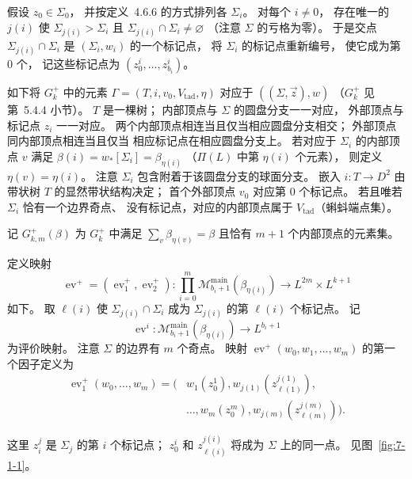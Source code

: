假设 $z_0\in\Sigma_0$，
并按定义~4.6.6 的方式排列各 $\Sigma_i$。
对每个 $i\ne0$，
存在唯一的 $j(i)$ 使
$\Sigma_{j(i)}>\Sigma_i$ 且
$\Sigma_{j(i)}\cap\Sigma_i\ne\varnothing$
（注意 $\Sigma$ 的亏格为零）。
于是交点
$\Sigma_{j(i)}\cap\Sigma_i$
是 $(\Sigma_i,w_i)$ 的一个标记点，
将 $\Sigma_i$ 的标记点重新编号，
使它成为第 $0$ 个，
记这些标记点为
$(z_0^i,\ldots,z_{b_i}^i)$。

如下将 $G_k^+$ 中的元素
$\Gamma=(T,i,v_0,V_{\mathrm{tad}},\eta)$
对应于 $((\Sigma,\vec z),w)$
（$G_k^+$ 见第~5.4.4 小节）。
$T$ 是一棵树；
内部顶点与 $\Sigma$ 的圆盘分支一一对应，
外部顶点与标记点 $z_i$ 一一对应。
两个内部顶点相连当且仅当相应圆盘分支相交；
外部顶点同内部顶点相连当且仅当
相应标记点在相应圆盘分支上。
若对应于 $\Sigma_i$ 的内部顶点 $v$
满足
$\beta(i)=w_*[\Sigma_i]=\beta_{\eta(i)}$
（$\Pi(L)$ 中第 $\eta(i)$ 个元素），
则定义 $\eta(v)=\eta(i)$。
注意 $\Sigma_i$ 包含附着于该圆盘分支的球面分支。
嵌入 $i:T\to D^2$ 由带状树
$T$ 的显然带状结构决定；
首个外部顶点 $v_0$ 对应第 $0$ 个标记点。
若且唯若 $\Sigma_i$ 恰有一个边界奇点、
没有标记点，对应的内部顶点属于
$V_{\mathrm{tad}}$（蝌蚪端点集）。

记 $G^+_{k,m}(\beta)$
为 $G_k^+$ 中满足
$\sum_v\beta_{\eta(v)}=\beta$
且恰有 $m+1$ 个内部顶点的元素集。

定义映射
\[
\operatorname{ev}^+
=(\operatorname{ev}_1^+,\operatorname{ev}_2^+):
\prod_{i=0}^{m}
\mathcal M^{\mathrm{main}}_{b_i+1}(\beta_{\eta(i)})
\longrightarrow L^{2m}\times L^{k+1}
\]
如下。
取 $\ell(i)$ 使
$\Sigma_{j(i)}\cap\Sigma_i$
成为 $\Sigma_{j(i)}$ 的第 $\ell(i)$ 个标记点。
记
\[
\operatorname{ev}^i:
\mathcal M^{\mathrm{main}}_{b_i+1}(\beta_{\eta(i)})
\longrightarrow L^{b_i+1}
\]
为评价映射。
注意 $\Sigma$ 的边界有 $m$ 个奇点。
映射 $\operatorname{ev}^+(w_0,w_1,\ldots,w_m)$
的第一个因子定义为
\[
\begin{aligned}
\operatorname{ev}_1^+(w_0,\ldots,w_m)
=\bigl(&w_1(z_0^1),
w_{j(1)}(z_{\ell(1)}^{j(1)}),\\
&\ldots,
w_m(z_0^m),
w_{j(m)}(z_{\ell(m)}^{j(m)})\bigr).
\end{aligned}
\]

这里 $z_i^j$ 是 $\Sigma_j$ 的第 $i$ 个标记点；
$z_0^i$ 和 $z_{\ell(i)}^{j(i)}$
将成为 $\Sigma$ 上的同一点。
见图~\ref{fig:7-1-1}。

